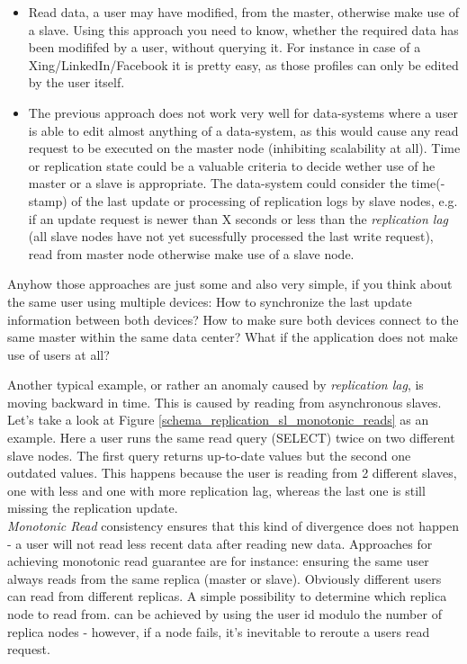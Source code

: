 {\begin{samepage}
\begin{itemize}
\item Read data, a user may have modified, from the master, otherwise make use of a slave. Using this approach you need to know, whether the required data has been modififed by a user, without querying it. For instance in case of a Xing/LinkedIn/Facebook it is pretty easy, as those profiles can only be edited by the user itself.
\item The previous approach does not work very well for data-systems where a user is able to edit almost anything of a data-system, as this would cause any read request to be executed on the master node (inhibiting scalability at all). Time or replication state could be a valuable criteria to decide wether use of he master or a slave is appropriate. The data-system could consider the time(-stamp) of the last update or processing of replication logs by slave nodes, e.g. if an update request is newer than X seconds or less than the \textit{replication lag} (all slave nodes have not yet sucessfully processed the last write request), read from master node otherwise make use of a slave node.\\
\end{itemize}
\end{samepage}
Anyhow those approaches are just some and also very simple, if you think about the same user using multiple devices: How to synchronize the last update information between both devices? How to make sure both devices connect to the same master within the same data center? What if the application does not make use of users at all?

Another typical example, or rather an anomaly caused by \textit{replication lag}, is moving backward in time. This is caused by reading from asynchronous slaves. Let's take a look at Figure \ref{schema_replication_sl_monotonic_reads} as an example. Here a user runs the same read query (SELECT) twice on two different slave nodes. The first query returns up-to-date values but the second one outdated values. This happens because the user is reading from 2 different slaves, one with less and one with more replication lag, whereas the last one is still missing the replication update.\\
\textit{Monotonic Read} consistency ensures that this kind of divergence does not happen - a user will not read less recent data after reading new data. Approaches for achieving monotonic read guarantee are for instance: ensuring the same user always reads from the same replica (master or slave). Obviously different users can read from different replicas. A simple possibility to determine which replica node to read from. can be achieved by using the user id modulo the number of replica nodes - however, if a node fails, it's inevitable to reroute a users read request.\\

}
